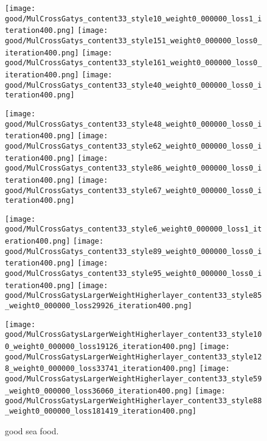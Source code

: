 \documentclass[runningheads]{llncs}
\begin{document}
\begin{figure*}[!htbp]
\centering
\small 

	\texttt{[image: good/MulCrossGatys\_content33\_style10\_weight0\_000000\_loss1\_iteration400.png]}
    \texttt{[image: good/MulCrossGatys\_content33\_style151\_weight0\_000000\_loss0\_iteration400.png]}
    \texttt{[image: good/MulCrossGatys\_content33\_style161\_weight0\_000000\_loss0\_iteration400.png]}
    \texttt{[image: good/MulCrossGatys\_content33\_style40\_weight0\_000000\_loss0\_iteration400.png]}
    
    \texttt{[image: good/MulCrossGatys\_content33\_style48\_weight0\_000000\_loss0\_iteration400.png]}
    \texttt{[image: good/MulCrossGatys\_content33\_style62\_weight0\_000000\_loss0\_iteration400.png]}
    \texttt{[image: good/MulCrossGatys\_content33\_style86\_weight0\_000000\_loss0\_iteration400.png]}
    \texttt{[image: good/MulCrossGatys\_content33\_style67\_weight0\_000000\_loss0\_iteration400.png]}
    
    \texttt{[image: good/MulCrossGatys\_content33\_style6\_weight0\_000000\_loss1\_iteration400.png]}
    \texttt{[image: good/MulCrossGatys\_content33\_style89\_weight0\_000000\_loss0\_iteration400.png]}
    \texttt{[image: good/MulCrossGatys\_content33\_style95\_weight0\_000000\_loss0\_iteration400.png]}
    \texttt{[image: good/MulCrossGatysLargerWeightHigherlayer\_content33\_style85\_weight0\_000000\_loss29926\_iteration400.png]}
    
        \texttt{[image: good/MulCrossGatysLargerWeightHigherlayer\_content33\_style100\_weight0\_000000\_loss19126\_iteration400.png]}
    \texttt{[image: good/MulCrossGatysLargerWeightHigherlayer\_content33\_style128\_weight0\_000000\_loss33741\_iteration400.png]}
    \texttt{[image: good/MulCrossGatysLargerWeightHigherlayer\_content33\_style59\_weight0\_000000\_loss36060\_iteration400.png]}
    \texttt{[image: good/MulCrossGatysLargerWeightHigherlayer\_content33\_style88\_weight0\_000000\_loss181419\_iteration400.png]}
\caption{good sea food.  }
\label{fig:good1}
\end{figure*}
\end{document}
